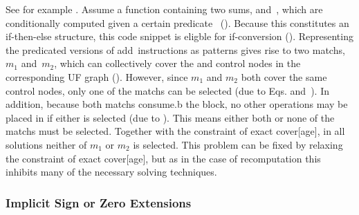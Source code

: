 %
See for example .
%
Assume a \gls{function} containing two sums,  and~, which are
conditionally computed given a certain predicate~
().
%
Because this constitutes an if-then-else structure, this code snippet is eligble
for \gls{if-conversion} ().
%
Representing the predicated versions of add~\glspl{instruction} as
\glspl{pattern} gives rise to two \glspl{match}, $m_1$ and~$m_2$, which can
collectively cover the  and \glspl{control node} in
the corresponding \gls{UF graph} ().
%
However, since $m_1$ and $m_2$ both cover the same \glspl{control node}, only
one of the \glspl{match} can be selected (due to
Eqs.\thinspace{}
and~).
%
In addition, because both \glspl{match} \gls{consume.b} the 
\gls{block}, no other \glspl{operation} may be placed in  if
either is selected (due to ).
%
This means either both or none of the \glspl{match} must be selected.
%
Together with the \gls{constraint} of exact \gls{cover}[age], in all
\glspl{solution} neither of $m_1$ or $m_2$ is selected.
%
This problem can be fixed by relaxing the \gls{constraint} of exact
\gls{cover}[age], but as in the case of \gls{recomputation} this inhibits many
of the necessary solving techniques.


\subsubsection{Implicit Sign or Zero Extensions}

